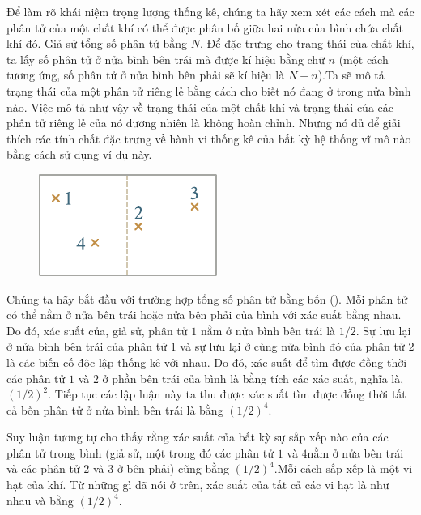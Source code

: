 Để làm rõ khái niệm trọng lượng thống kê, chúng ta hãy xem xét các cách mà các phân tử của một chất khí có thể được phân bố giữa hai nửa của bình chứa chất khí đó. Giả sử tổng số phân tử bằng $N$. Để đặc trưng cho trạng thái của chất khí, ta lấy số phân tử ở nửa bình bên trái mà được kí hiệu bằng chữ $n$ (một cách tương ứng, số phân tử ở nửa bình bên phải sẽ kí hiệu là $N-n$).Ta sẽ mô tả trạng thái của một phân tử riêng lẻ bằng cách cho biết nó đang ở trong nửa bình nào. Việc mô tả như vậy về trạng thái của một chất khí và trạng thái của các phân tử riêng lẻ của nó đương nhiên là không hoàn chỉnh. Nhưng nó đủ để giải thích các tính chất đặc trưng về hành vi thống kê của bất kỳ hệ thống vĩ mô nào bằng cách sử dụng ví dụ này.

\begin{figure}[!htb]
	\begin{center}
		\includegraphics[scale=1.0]{figures/ch_11/fig_11_24.pdf}
		\caption[]{}
		\label{fig:11_24}
	\end{center}
	\vspace{-0.8cm}
\end{figure}

Chúng ta hãy bắt đầu với trường hợp tổng số phân tử bằng bốn (). Mỗi phân tử có thể nằm ở nửa bên trái hoặc nửa bên phải của bình với xác suất bằng nhau. Do đó, xác suất của, giả sử, phân tử $1$ nằm ở nửa bình bên trái là $1/2$. Sự lưu lại ở nửa bình bên trái của phân tử $1$ và sự lưu lại ở cùng nửa bình đó của phân tử $2$ là các biến cố độc lập thống kê với nhau. Do đó, xác suất để tìm được đồng thời các phân tử $1$ và $2$ ở phần bên trái của bình là bằng tích các xác suất, nghĩa là, $(1/2)^2$. Tiếp tục các lập luận này ta thu được xác suất tìm được đồng thời tất cả bốn phân tử ở nửa bình bên trái là bằng $(1/2)^4$.

Suy luận tương tự cho thấy rằng xác suất của bất kỳ sự sắp xếp nào của các phân tử trong bình (giả sử, một trong đó các phân tử $1$ và $4$nằm ở nửa bên trái và các phân tử $2$ và $3$ ở bên phải) cũng bằng $(1/2)^4$.Mỗi cách sắp xếp là một vi hạt của khí. Từ những gì đã nói ở trên, xác suất của tất cả các vi hạt là như nhau và bằng $(1/2)^4$.

